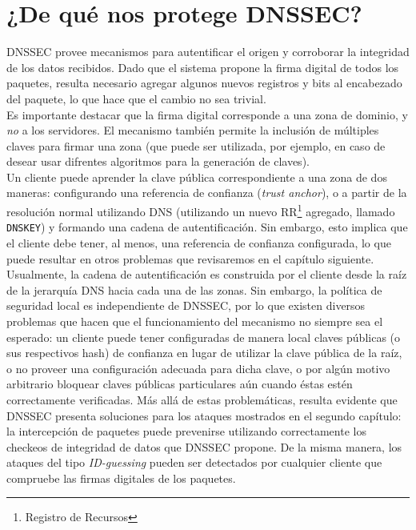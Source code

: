 \chapter{¿De qu\'e nos protege DNSSEC?}
DNSSEC provee mecanismos para autentificar el origen y corroborar la integridad de los datos recibidos. Dado que el sistema propone la firma digital de todos los paquetes, resulta necesario agregar algunos nuevos registros y bits al encabezado del paquete, lo que hace que el cambio no sea trivial.\\
Es importante destacar que la firma digital corresponde a una zona de dominio, y \textit{no} a los servidores. El mecanismo tambi\'en permite la inclusi\'on de m\'ultiples claves para firmar una zona (que puede ser utilizada, por ejemplo, en caso de desear usar difrentes algoritmos para la generaci\'on de claves).\\
Un cliente puede aprender la clave p\'ublica correspondiente a una zona de dos maneras: configurando una referencia de confianza (\textit{trust anchor}), o a partir de la resoluci\'on normal utilizando DNS (utilizando un nuevo RR\footnote{Registro de Recursos} agregado, llamado \texttt{DNSKEY}) y formando una cadena de autentificaci\'on. Sin embargo, esto implica que el cliente debe tener, al menos, una referencia de confianza configurada, lo que puede resultar en otros problemas que revisaremos en el cap\'itulo siguiente.\\
Usualmente, la cadena de autentificaci\'on es construida por el cliente desde la ra\'iz de la jerarqu\'ia DNS hacia cada una de las zonas. Sin embargo, la pol\'itica de seguridad local es independiente de DNSSEC, por lo que existen diversos problemas que hacen que el funcionamiento del mecanismo no siempre sea el esperado: un cliente puede tener configuradas de manera local claves p\'ublicas (o sus respectivos hash) de confianza en lugar de utilizar la clave p\'ublica de la ra\'iz, o no proveer una configuraci\'on adecuada para dicha clave, o por alg\'un motivo arbitrario bloquear claves p\'ublicas particulares a\'un cuando \'estas est\'en correctamente verificadas.
M\'as all\'a de estas problem\'aticas, resulta evidente que DNSSEC presenta soluciones para los ataques mostrados en el segundo cap\'itulo: la intercepci\'on de paquetes puede prevenirse utilizando correctamente los checkeos de integridad de datos que DNSSEC propone. De la misma manera, los ataques del tipo \textit{ID-guessing} pueden ser detectados por cualquier cliente que compruebe las firmas digitales de los paquetes.\\
